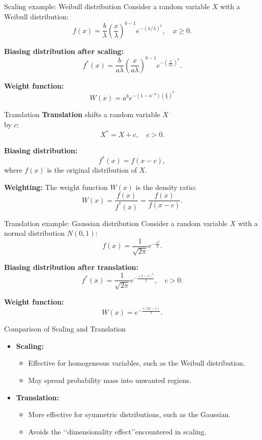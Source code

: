 \documentclass{beamer}
\begin{document}
\begin{frame}{Scaling example: Weibull distribution}
    Consider a random variable $X$ with a Weibull distribution:
    \[
    f(x) = \frac{b}{\lambda}\left(\frac{x}{\lambda}\right)^{b-1} e^{-(x/\lambda)^b}, \quad x \geq 0.
    \]

    \textbf{Biasing distribution after scaling:}
    \[
    f^*(x) = \frac{b}{a\lambda}\left(\frac{x}{a\lambda}\right)^{b-1} e^{-\left(\frac{x}{a\lambda}\right)^b}.
    \]

    \textbf{Weight function:}
    \[
    W(x) = a^be^{-(1-a^{-b})(\frac{x}{\lambda})^b}
    \]
\end{frame}

\begin{frame}{Translation}
    \textbf{Translation} shifts a random variable $X$ \\ by $c$:
    \[
    X^* = X + c, \quad c > 0.
    \]

    \textbf{Biasing distribution:}
    \[
    f^*(x) = f(x - c),
    \]
    where $f(x)$ is the original distribution of $X$.

    \vspace{0.5cm}
    \textbf{Weighting:} The weight function $W(x)$ is the density ratio:
    \[
    W(x) = \frac{f(x)}{f^*(x)} = \frac{f(x)}{f(x - c)}.
    \]
\end{frame}

\begin{frame}{Translation example: Gaussian distribution}
    Consider a random variable $X$ with a normal distribution $N(0, 1)$:
    \[
    f(x) = \frac{1}{\sqrt{2\pi}} e^{-\frac{x^2}{2}}.
    \]

    \textbf{Biasing distribution after translation:}
    \[
    f^*(x) = \frac{1}{\sqrt{2\pi}} e^{-\frac{(x - c)^2}{2}}, \quad c > 0.
    \]

    \textbf{Weight function:}
    \[
    W(x) = e^{-\frac{c(2x - c)}{2}}.
    \]
\end{frame}

\begin{frame}{Comparison of Scaling and Translation}
    \begin{itemize}
        \item \textbf{Scaling:}
        \begin{itemize}
            \item Effective for homogeneous variables, such as the Weibull distribution.
            \item May spread probability mass into unwanted regions.
        \end{itemize}
        \item \textbf{Translation:}
        \begin{itemize}
            \item More effective for symmetric distributions, such as the Gaussian.
            \item Avoids the \lq\lq dimensionality effect\rq\rq \space encountered in scaling.
        \end{itemize}
    \end{itemize}
\end{frame}
\end{document}
